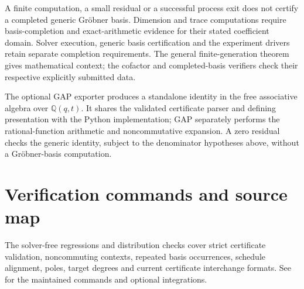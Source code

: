 \documentclass[11pt]{article}
\newcommand{\Q}{\mathbb Q}
\begin{document}
A finite computation, a small residual or a successful process exit does not
certify a completed generic Gr\"obner basis. Dimension and trace computations
require basis-completion and exact-arithmetic evidence for their stated
coefficient domain. Solver execution, generic basis certification and the
experiment drivers retain separate completion requirements. The general
finite-generation theorem gives mathematical context; the cofactor and
completed-basis verifiers check their respective explicitly submitted data.

The optional GAP exporter produces a standalone identity in the free associative
algebra over $\Q(q,t)$. It shares the validated certificate parser and defining
presentation with the Python implementation; GAP separately performs the
rational-function arithmetic and noncommutative expansion. A zero residual
checks the generic identity, subject to the denominator hypotheses above,
without a Gr\"obner-basis computation.

\section{Verification commands and source map}
The solver-free regressions and distribution checks cover strict certificate validation,
noncommuting contexts, repeated basis occurrences, schedule alignment, poles,
target degrees and current certificate interchange formats. See
 for the maintained commands and optional integrations.
\end{document}
